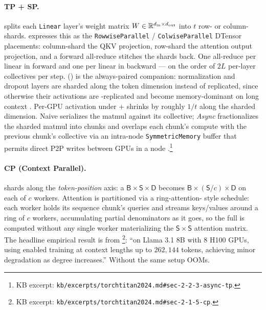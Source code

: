 \paragraph{TP + SP.}  \citep[\S 2.1.3]{torchtitan2024}
splits each \texttt{Linear} layer's weight matrix $W \in \mathbb{R}^{d_{\text{in}}
\times d_{\text{out}}}$ into $t$ row- or column-shards. 
expresses this as the \texttt{RowwiseParallel} / \texttt{ColwiseParallel}
DTensor placements: column-shard the QKV projection, row-shard the
attention output projection, and a forward all-reduce stitches the
shards back. One all-reduce per linear in forward and one per linear
in backward --- on the order of $2L$ per-layer collectives per step.
 () is the always-paired companion: normalization
and dropout layers are sharded along the token dimension instead of
replicated, since otherwise their activations are -replicated and
become memory-dominant on long context \citep[\S 2.1.3]{torchtitan2024}.
Per-GPU activation under + shrinks by roughly $1/t$ along the
sharded dimension. Naive  serializes the matmul against its
collective; \emph{Async } fractionalizes the sharded matmul into
chunks and overlaps each chunk's compute with the previous chunk's
collective via an intra-node \texttt{SymmetricMemory} buffer that
permits direct P2P writes between GPUs in a node \citep[\S
2.2.3]{torchtitan2024}.\footnote{KB excerpt:
\nolinkurl{kb/excerpts/torchtitan2024.md#sec-2-2-3-async-tp}.}

\paragraph{CP (Context Parallel).}  shards along the
\emph{token-position} axis: a $\mathsf{B}\!\times\!\mathsf{S}\!\times\!\mathsf{D}$
 becomes $\mathsf{B}\!\times\!(\mathsf{S}/c)\!\times\!\mathsf{D}$
on each of $c$ workers. Attention is partitioned via a ring-attention-
style schedule: each worker holds its sequence chunk's queries and
streams keys/values around a ring of $c$ workers, accumulating partial
 denominators as it goes, so the full  is computed
without any single worker materializing the $\mathsf{S}\!\times\!\mathsf{S}$
attention matrix. The headline empirical result is from
\citet[\S 2.1.5]{torchtitan2024}\footnote{KB excerpt:
\nolinkurl{kb/excerpts/torchtitan2024.md#sec-2-1-5-cp}.}: ``on Llama 3.1
8B with 8 H100 GPUs, using  enabled training at context lengths up
to $262{,}144$ tokens, achieving minor  degradation as  degree
increases.'' Without  the same setup OOMs.

